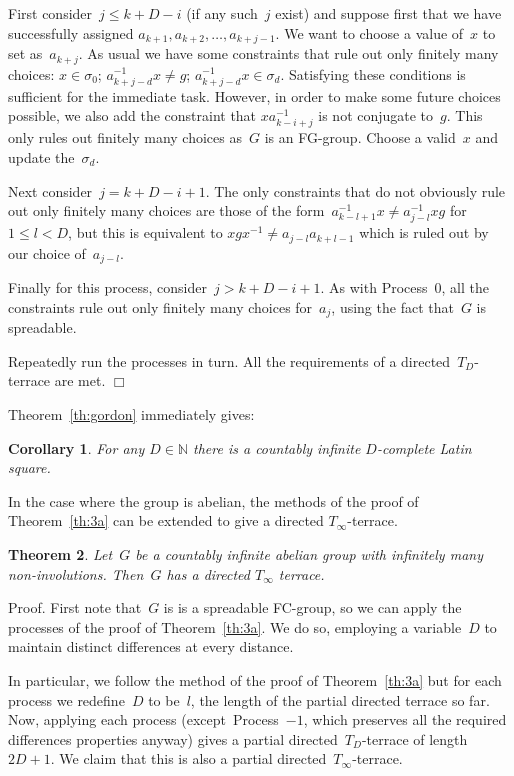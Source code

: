 \documentclass[12pt,a4paper]{article}
\newtheorem{thm}{Theorem}
\newtheorem{cor}[thm]{Corollary}
\newcommand{\N}{\mathbb{N}}
\newcommand{\qed}{\unskip\protect\nolinebreak\mbox{\quad$\Box$}\vspace{3mm}}
\begin{document}
First consider~$j \leq k+D-i$ (if any such~$j$ exist) and suppose first that we have successfully assigned  $a_{k+1}, a_{k+2}, \ldots, a_{k+j-1}$.  We want to choose a value of~$x$ to set as~$a_{k+j}$.  As usual we have some constraints that rule out only finitely many choices: $x \in \sigma_0$; $a_{k+j-d}^{-1} x \neq g$;  $a_{k+j-d}^{-1}x \in \sigma_d$.  Satisfying these conditions is  sufficient for the immediate task.  However, in order to make some future choices possible, we also add the constraint that $xa_{k-i+j}^{-1}$ is not conjugate to~$g$.  This only rules out finitely many choices as~$G$ is an FG-group.  Choose a valid~$x$ and update the~$\sigma_d$.

Next consider~$j = k+D-i+1$.  The only constraints that do not obviously rule out only finitely many choices are those of the form~$a_{k-l+1}^{-1}x \neq a_{j -l}^{-1}xg$ for~$1 \leq l < D$, but this is equivalent to $ x g x^{-1}\neq a_{j-l}a_{k+l-1} $ which is ruled out by our choice of~$a_{j-l}$.

Finally for this process, consider~$j > k+D-i+1$.  As with Process~0, all the constraints rule out only finitely many choices for~$ a_j$, using the fact that~$G$ is spreadable.

Repeatedly run the processes in turn.  All the requirements of a directed~$T_D$-terrace are met.
\qed

Theorem~\ref{th:gordon} immediately gives:

\begin{cor}
For any $D \in \N$ there is a countably infinite $D$-complete Latin square.
\end{cor}


In the case where the group is abelian, the methods of the proof of Theorem~\ref{th:3a} can be extended to give a directed $T_{\infty}$-terrace.

\begin{thm}\label{th:3b}
Let~$G$ be a countably infinite abelian group with infinitely many non-involutions.  Then~$G$ has a directed $T_{\infty}$ terrace.
\end{thm}

\noindent
Proof.
First note that~$G$ is is a spreadable FC-group, so we can apply the processes of the proof of Theorem~\ref{th:3a}.  We do so, employing a variable~$D$ to maintain distinct differences at every distance.

In particular, we follow the method of the proof of Theorem~\ref{th:3a} but for each process we redefine~$D$ to be~$l$, the length of the partial directed terrace so far.  Now, applying each process (except~Process~$-1$, which preserves all the required differences properties anyway) gives a partial directed~$T_D$-terrace of length~$2D+1$.  We claim that this is also a partial directed~$T_{\infty}$-terrace.
\end{document}
